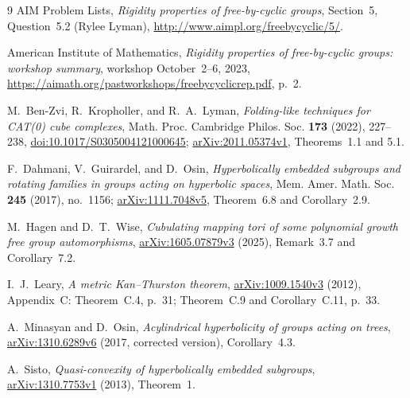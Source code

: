 \documentclass[11pt]{article}
\begin{document}
\begin{thebibliography}{9}
\small
{}
AIM Problem Lists, \emph{Rigidity properties of free-by-cyclic groups},
Section~5, Question~5.2 (Rylee Lyman),
\url{http://www.aimpl.org/freebycyclic/5/}.

American Institute of Mathematics, \emph{Rigidity properties of
free-by-cyclic groups: workshop summary}, workshop October~2--6, 2023,
\url{https://aimath.org/pastworkshops/freebycyclicrep.pdf}, p.~2.

M.~Ben-Zvi, R.~Kropholler, and R.~A.~Lyman,
\emph{Folding-like techniques for CAT(0) cube complexes},
Math. Proc. Cambridge Philos. Soc. \textbf{173} (2022), 227--238,
\href{https://doi.org/10.1017/S0305004121000645}{doi:10.1017/S0305004121000645};
\href{https://arxiv.org/abs/2011.05374v1}{arXiv:2011.05374v1},
Theorems~1.1 and 5.1.

F.~Dahmani, V.~Guirardel, and D.~Osin,
\emph{Hyperbolically embedded subgroups and rotating families in groups
acting on hyperbolic spaces}, Mem. Amer. Math. Soc. \textbf{245} (2017),
no.~1156; \href{https://arxiv.org/abs/1111.7048v5}{arXiv:1111.7048v5},
Theorem~6.8 and Corollary~2.9.

M.~Hagen and D.~T.~Wise,
\emph{Cubulating mapping tori of some polynomial growth free group
automorphisms}, \href{https://arxiv.org/abs/1605.07879v3}{arXiv:1605.07879v3}
(2025), Remark~3.7 and Corollary~7.2.

I.~J.~Leary, \emph{A metric Kan--Thurston theorem},
\href{https://arxiv.org/abs/1009.1540v3}{arXiv:1009.1540v3} (2012),
Appendix~C: Theorem~C.4, p.~31; Theorem~C.9 and Corollary~C.11, p.~33.

A.~Minasyan and D.~Osin,
\emph{Acylindrical hyperbolicity of groups acting on trees},
\href{https://arxiv.org/abs/1310.6289v6}{arXiv:1310.6289v6} (2017,
corrected version), Corollary~4.3.

A.~Sisto, \emph{Quasi-convexity of hyperbolically embedded subgroups},
\href{https://arxiv.org/abs/1310.7753v1}{arXiv:1310.7753v1} (2013),
Theorem~1.
\end{thebibliography}
\end{document}
